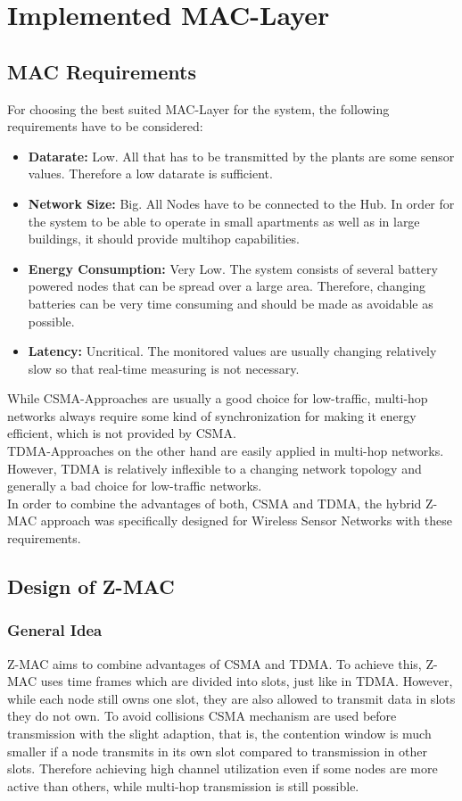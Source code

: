 \section{Implemented MAC-Layer}
\subsection{MAC Requirements}
For choosing the best suited MAC-Layer for the system, the following requirements have to be considered:

\begin{itemize}
	\item \textbf{Datarate:}
	Low. All that has to be transmitted by the plants are some sensor values. Therefore a low datarate is sufficient.
	\item \textbf{Network Size:}
	Big. All Nodes have to be connected to the Hub. In order for the system to be able to operate in small apartments as well as in large buildings, it should provide multihop capabilities.
	\item \textbf{Energy Consumption:}
	Very Low. The system consists of several battery powered nodes that can be spread over a large area. Therefore, changing batteries can be very time consuming and should be made as avoidable as possible.
	\item \textbf{Latency:}
	Uncritical. The monitored values are usually changing relatively slow so that real-time measuring is not necessary.
\end{itemize}

While CSMA-Approaches are usually a good choice for low-traffic, multi-hop networks always require some kind of synchronization for making it energy efficient, which is not provided by CSMA.\\
TDMA-Approaches on the other hand are easily applied in multi-hop networks. However, TDMA is relatively inflexible to a changing network topology and generally a bad choice for low-traffic networks.\\
In order to combine the advantages of both, CSMA and TDMA, the hybrid Z-MAC approach was specifically designed for Wireless Sensor Networks with these requirements.

\subsection{Design of Z-MAC}
\subsubsection{General Idea}
Z-MAC aims to combine advantages of CSMA and TDMA. To achieve this, Z-MAC uses time frames which are divided into slots, just like in TDMA. However, while each node still owns one slot, they are also allowed to transmit data in slots they do not own. To avoid collisions CSMA mechanism are used before transmission with the slight adaption, that is, the contention window is much smaller if a node transmits in its own slot compared to transmission in other slots. Therefore achieving high channel utilization even if some nodes are more active than others, while multi-hop transmission is still possible.\cite{rhee2008z}

